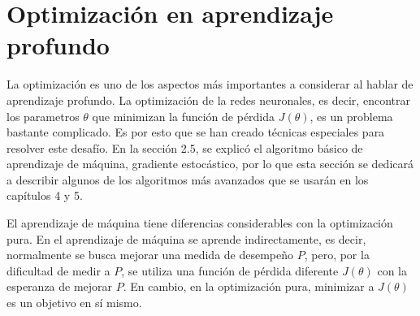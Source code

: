 

\section{Optimización en aprendizaje profundo}
La optimización es uno de los aspectos más importantes a considerar al hablar de aprendizaje profundo. La optimización de la redes neuronales, es decir, encontrar los parametros $\theta$ que minimizan la función de pérdida $J(\theta)$, es un problema bastante complicado. Es por esto que se han creado técnicas especiales para resolver este desafío. En la sección 2.5, se explicó el algoritmo básico de aprendizaje de máquina, gradiente estocástico, por lo que esta sección se dedicará a describir algunos de los algoritmos más avanzados que se usarán en los capítulos 4 y 5.

\vspace{1em}

El aprendizaje de máquina tiene diferencias considerables con la optimización pura. En el aprendizaje de máquina se aprende indirectamente, es decir, normalmente se busca mejorar una medida de desempeño $P$, pero, por la dificultad de medir a $P$, se utiliza una función de pérdida diferente $J(\theta)$ con la esperanza de mejorar $P$. En cambio, en la optimización pura, minimizar a $J(\theta)$ es un objetivo en sí mismo.
\cite{goodfellow-et-al-2016}

